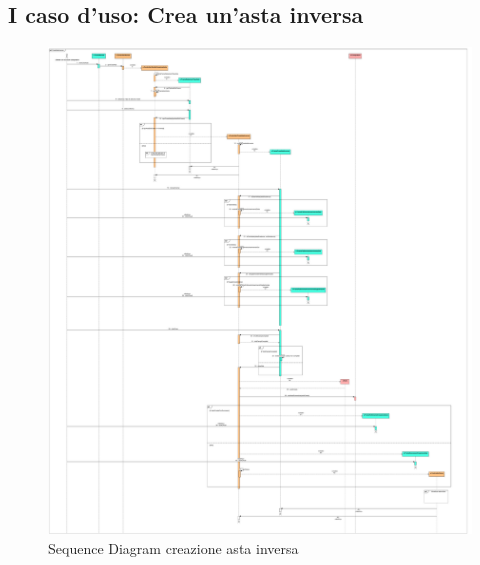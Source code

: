         \subsection{I caso d'uso: Crea un’asta inversa}
            \begin{figure}[htbp!]
            \centering
                \includegraphics[width=0.93\linewidth]{Immagini/Diagrammi/Sequence Diagram/Analisi/CreaAstaInversa.pdf}
            \caption{Sequence Diagram creazione asta inversa}
            \end{figure}

